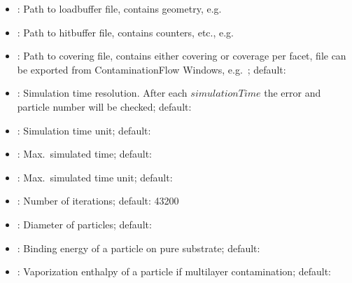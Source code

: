 \begin{itemize}[noitemsep,topsep=0pt, partopsep=0pt]
\item {}: Path to loadbuffer file, contains geometry, e.g.\ 
\item {}: Path to hitbuffer file, contains counters, etc., e.g.\ 
\item {}: Path to covering file, contains either covering or coverage per facet, file can be exported from ContaminationFlow Windows, e.g.\ ; default: 
\item {}: Simulation time resolution. After each $simulationTime$ the error and particle number will be checked; default: 
\item {}: Simulation time unit; default: 
\item {}: Max.\ simulated time; default: 
\item {}: Max.\ simulated time unit; default: 
\item {}: Number of iterations; default: 43200
\item {}: Diameter of particles; default:
\item {}: Binding energy of a particle on pure substrate; default:
\item {}: Vaporization enthalpy of a particle if multilayer contamination; default:

\end{itemize}
